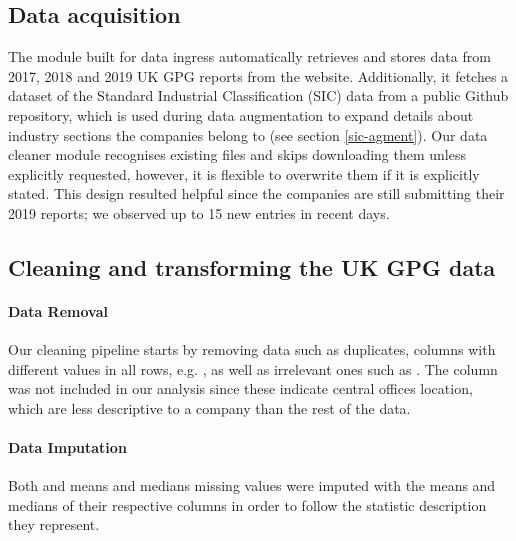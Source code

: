 \subsection{Data acquisition}
The module built for data ingress automatically retrieves and stores data from 2017, 2018 and 2019 UK GPG reports from the  website. Additionally, it fetches a dataset of the Standard Industrial Classification (SIC) data from a public Github repository, which is used during data augmentation to expand details about industry sections the companies belong to (see section \ref{sic-agment}). Our data cleaner module recognises existing files and skips downloading them unless explicitly requested, however, it is flexible to overwrite them if it is explicitly stated. This design resulted helpful since the companies are still submitting their 2019 reports; we observed up to 15 new entries in recent days.

\subsection{Cleaning and transforming the UK GPG data}
\paragraph{Data Removal} Our cleaning pipeline starts by removing data such as duplicates, columns with different values in all rows, e.g. , as well as irrelevant ones such as . The   column was not included in our analysis since these indicate central offices location, which are less descriptive to a company than the rest of the data.

\paragraph{Data Imputation} Both  and  means and medians missing values were imputed with the means and medians of their respective columns in order to follow the statistic description they represent.

